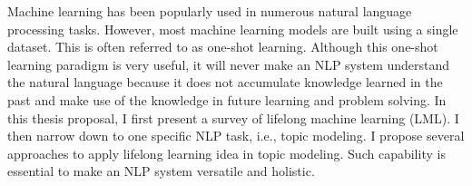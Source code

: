 Machine learning has been popularly used in numerous natural language processing tasks. However, most machine learning models are built using a single dataset. This is often referred to as one-shot learning. Although this one-shot learning paradigm is very useful, it will never make an NLP system understand the natural language because it does not accumulate knowledge learned in the past and make use of the knowledge in future learning and problem solving. In this thesis proposal, I first present a survey of lifelong machine learning (LML). I then narrow down to one specific NLP task, i.e., topic modeling. I propose several approaches to apply lifelong learning idea in topic modeling. Such capability is essential to make an NLP system versatile and holistic.
